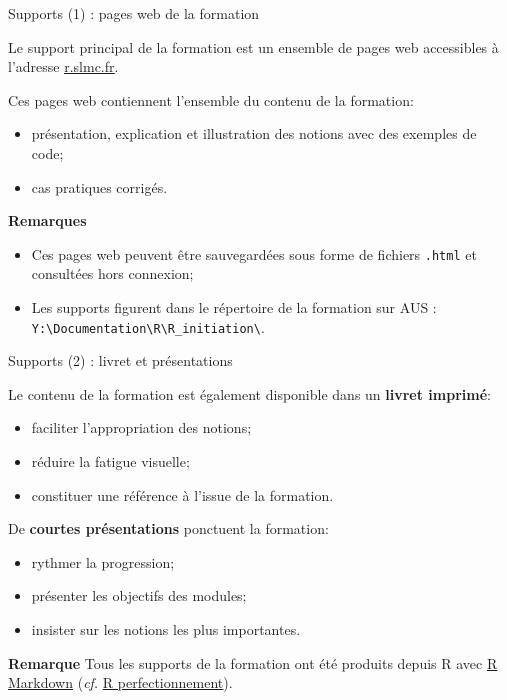 \documentclass[12pt,ignorenonframetext,]{beamer}
\providecommand{\tightlist}{%
  \setlength{\itemsep}{0pt}\setlength{\parskip}{0pt}}
\newcommand{\strong}[1]{\textbf{\textcolor{redInsee}{#1}}}
\newcommand{\link}[1]{\textcolor{redInsee}{\underline{#1}}}
\begin{document}
\begin{frame}[fragile]{Supports (1) : pages web de la formation}
\protect\hypertarget{supports-1-pages-web-de-la-formation}{}

Le support principal de la formation est un ensemble de pages web
accessibles à l’adresse \href{http://r.slmc.fr}{\link{r.slmc.fr}}.

\bigskip \pause Ces pages web contiennent l’ensemble du contenu de la
formation:

\begin{itemize}
\tightlist
\item
  présentation, explication et illustration des notions avec des
  exemples de code;
\item
  cas pratiques corrigés.
\end{itemize}

\bigskip \pause \strong{Remarques}

\begin{itemize}
\tightlist
\item
  Ces pages web peuvent être sauvegardées sous forme de fichiers
  \texttt{.html} et consultées hors connexion;
\item
  Les supports figurent dans le répertoire de la formation sur AUS :
  \texttt{Y:\textbackslash{}Documentation\textbackslash{}R\textbackslash{}R\_initiation\textbackslash{}}.
\end{itemize}

\end{frame}

\begin{frame}{Supports (2) : livret et présentations}
\protect\hypertarget{supports-2-livret-et-presentations}{}

Le contenu de la formation est également disponible dans un
\strong{livret imprimé}:

\begin{itemize}
\tightlist
\item
  faciliter l’appropriation des notions;
\item
  réduire la fatigue visuelle;
\item
  constituer une référence à l’issue de la formation.
\end{itemize}

\bigskip \pause De \strong{courtes présentations} ponctuent la
formation:

\begin{itemize}
\tightlist
\item
  rythmer la progression;
\item
  présenter les objectifs des modules;
\item
  insister sur les notions les plus importantes.
\end{itemize}

\bigskip \pause \strong{Remarque} Tous les supports de la formation ont
été produits depuis R avec
\href{http://rmarkdown.rstudio.com/}{\link{R Markdown}} (\emph{cf.}
\href{http://t.slmc.fr/perf}{\link{R perfectionnement}}).

\end{frame}
\end{document}
